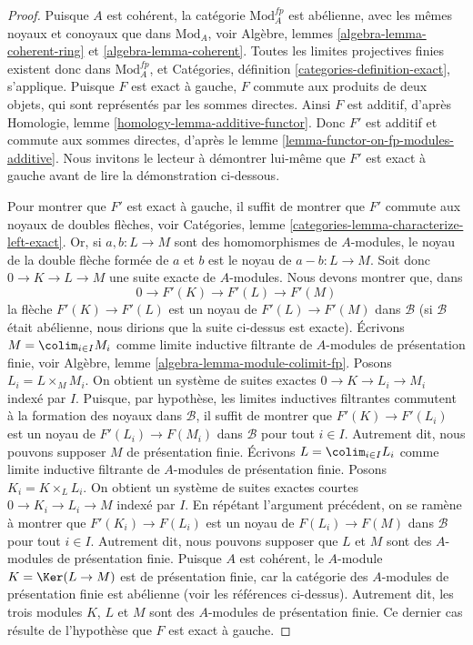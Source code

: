 \begin{proof}
Puisque $A$ est cohérent, la catégorie $\text{Mod}^{fp}_A$ est abélienne,
avec les mêmes noyaux et conoyaux que dans $\text{Mod}_A$, voir
Algèbre, lemmes \ref{algebra-lemma-coherent-ring} et
\ref{algebra-lemma-coherent}. Toutes les limites projectives finies existent donc dans
$\text{Mod}^{fp}_A$, et
Catégories, définition \ref{categories-definition-exact}, s'applique.
Puisque $F$ est exact à gauche, $F$ commute aux produits de deux objets, qui sont
représentés par les sommes directes. Ainsi $F$ est additif, d'après
Homologie, lemme \ref{homology-lemma-additive-functor}.
Donc $F'$ est additif et commute aux sommes directes, d'après le
lemme \ref{lemma-functor-on-fp-modules-additive}.
Nous invitons le lecteur à démontrer lui-même que $F'$ est exact à gauche
avant de lire la démonstration ci-dessous.

\medskip\noindent
Pour montrer que $F'$ est exact à gauche, il suffit de montrer que $F'$ commute
aux noyaux de doubles flèches, voir
Catégories, lemme \ref{categories-lemma-characterize-left-exact}.
Or, si $a, b : L \to M$ sont des homomorphismes de $A$-modules, le
noyau de la double flèche formée de $a$ et $b$ est le noyau de $a - b : L \to M$.
Soit donc $0 \to K \to L \to M$ une suite exacte
de $A$-modules. Nous devons montrer que, dans
$$
0 \to F'(K) \to F'(L) \to F'(M)
$$
la flèche $F'(K) \to F'(L)$ est un noyau de $F'(L) \to F'(M)$ dans $\mathcal{B}$
(si $\mathcal{B}$ était abélienne, nous dirions que la suite ci-dessus
est exacte).
Écrivons $M = \colim_{i \in I} M_i$ comme limite inductive filtrante de
$A$-modules de présentation finie, voir
Algèbre, lemme \ref{algebra-lemma-module-colimit-fp}.
Posons $L_i = L \times_M M_i$. 
On obtient un système de suites exactes $0 \to K \to L_i \to M_i$
indexé par $I$. Puisque, par hypothèse, les limites inductives filtrantes commutent à la formation des noyaux
dans $\mathcal{B}$, 
il suffit de montrer que $F'(K) \to F'(L_i)$ est un noyau de
$F'(L_i) \to F(M_i)$ dans $\mathcal{B}$ pour tout $i \in I$. Autrement dit, nous pouvons
supposer $M$ de présentation finie. Écrivons $L = \colim_{i \in I} L_i$
comme limite inductive filtrante de $A$-modules de présentation finie.
Posons $K_i = K \times_L L_i$. On obtient un système de suites exactes courtes
$0 \to K_i \to L_i \to M$ indexé par $I$.
En répétant l'argument précédent, on se ramène à montrer que
$F'(K_i) \to F(L_i)$ est un noyau de
$F(L_i) \to F(M)$ dans $\mathcal{B}$ pour tout $i \in I$.
Autrement dit, nous pouvons supposer que
$L$ et $M$ sont des $A$-modules de présentation finie.
Puisque $A$ est cohérent, le $A$-module $K = \Ker(L \to M)$ est
de présentation finie, car la catégorie des
$A$-modules de présentation finie est abélienne (voir les références ci-dessus).
Autrement dit, les trois modules $K$, $L$ et $M$
sont des $A$-modules de présentation finie. Ce dernier cas résulte
de l'hypothèse que $F$ est exact à gauche.
\end{proof}

